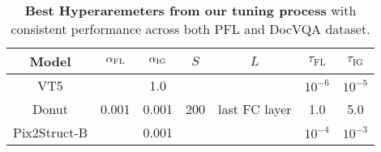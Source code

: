 \begin{table}[t]
\begin{center}
\begin{small}
\small
\begin{tabular}{ccccccc}
\toprule
Model & $\alpha_{\textsc{FL}}$ & $\alpha_{\textsc{IG}}$ & $S$ & $L$ & $\tau_{\text{FL}}$ & $\tau_{\text{IG}}$\\
\midrule 
VT5 & \multirow{3}{*}{0.001} & 1.0 & \multirow{3}{*}{200} & \multirow{3}{*}{last FC layer} & $10^{-6}$ & $10^{-5}$\\
Donut &  & 0.001 &  &  & 1.0 & 5.0\\
Pix2Struct-B &  & 0.001 &  &  & $10^{-4}$ & $10^{-3}$\\
\bottomrule
\end{tabular}
\end{small}
\end{center}
\caption{\textbf{Best Hyperaremeters from our tuning process} with consistent performance across both PFL and DocVQA dataset.}
\label{tab:best_hps}
\end{table}

